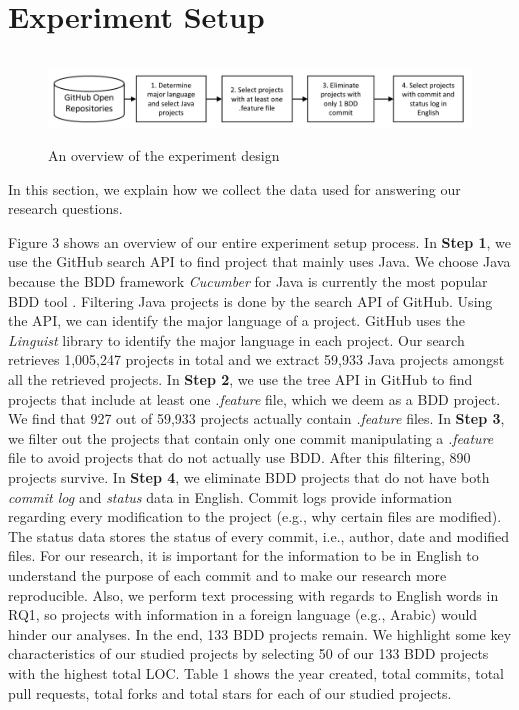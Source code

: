 
\section{Experiment Setup}
\begin{figure}
	\centering
	\includegraphics[height=0.9in, width=6.6in]{exp_setup.pdf}
	\caption{An overview of the experiment design}
\end{figure}
In this section, we explain how we collect the data used for answering our research questions.

Figure 3 shows an overview of our entire experiment setup process. In \textbf{Step 1}, we use the GitHub search API to find project that mainly uses Java. We choose Java because the BDD framework \textit{Cucumber} for Java is currently the most popular BDD tool \cite{BDDFrame}. Filtering Java projects is done by the search API of GitHub. Using the API, we can identify the major language of a project. GitHub uses the \textit{Linguist} library to identify the major language in each project. Our search retrieves 1,005,247 projects in total and we extract 59,933 Java projects amongst all the retrieved projects. In \textbf{Step 2}, we use the tree API in GitHub to find projects that include at least one \textit{.feature} file, which we deem as a BDD project. We find that 927 out of 59,933 projects actually contain \textit{.feature} files. In \textbf{Step 3}, we filter out the projects that contain only one commit manipulating a \textit{.feature} file to avoid projects that do not actually use BDD. After this filtering, 890 projects survive. In \textbf{Step 4}, we eliminate BDD projects that do not have both \textit {commit log} and \textit {status} data in English. Commit logs provide information regarding every modification to the project (e.g., why certain files are modified). The status data stores the status of every commit, i.e., author, date and modified files. For our research, it is important for the information to be in English to understand the purpose of each commit and to make our research more reproducible. Also, we perform text processing with regards to English words in RQ1, so projects with information in a foreign language (e.g., Arabic) would hinder our analyses. In the end, 133 BDD projects remain. We highlight some key characteristics of our studied projects by selecting 50 of our 133 BDD projects with the highest total LOC. Table 1 shows the year created, total commits, total pull requests, total forks and total stars for each of our studied projects.

